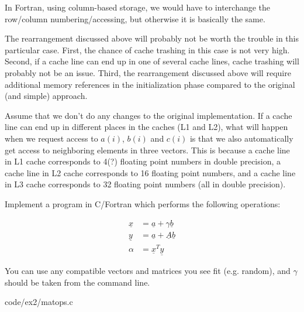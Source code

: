 In Fortran, using column-based storage, we would have to interchange the row/column numbering/accessing, but otherwise it is basically the same.

The rearrangement discussed above will probably not be worth the trouble in this particular case. First, the chance of cache trashing in this case is not very high. Second, if a cache line can end up in one of several cache lines, cache trashing will probably not be an issue. Third, the rearrangement discussed above will require additional memory references in the initialization phase compared to the original (and simple) approach.

Assume that we don't do any changes to the original implementation. If a cache line can end up in different places in the caches (L1 and L2), what will happen when we request access to $a(i)$, $b(i)$ and $c(i)$ is that we also automatically get access to neighboring elements in three vectors. This is because a cache line in L1 cache corresponds to 4(?) floating point numbers in double precision, a cache line in L2 cache corresponds to 16 floating point numbers, and a cache line in L3 cache corresponds to 32 floating point numbers (all in double precision).




\pagebreak
\begin{question}
Implement a program in C/Fortran which performs the following operations:

\begin{equation*}
  \begin{split}
    \underline{x} &= \underline{a} + \gamma\underline{b} \\
    \underline{y} &= \underline{a} + \underline{A}\underline{b} \\
    \alpha &= \underline{x}^T\underline{y}
  \end{split}
\end{equation*}


\noindent You can use any compatible vectors and matrices you see fit (e.g. random), and $\gamma$
should be taken from the command line.
\end{question}


  {code/ex2/matops.c}

